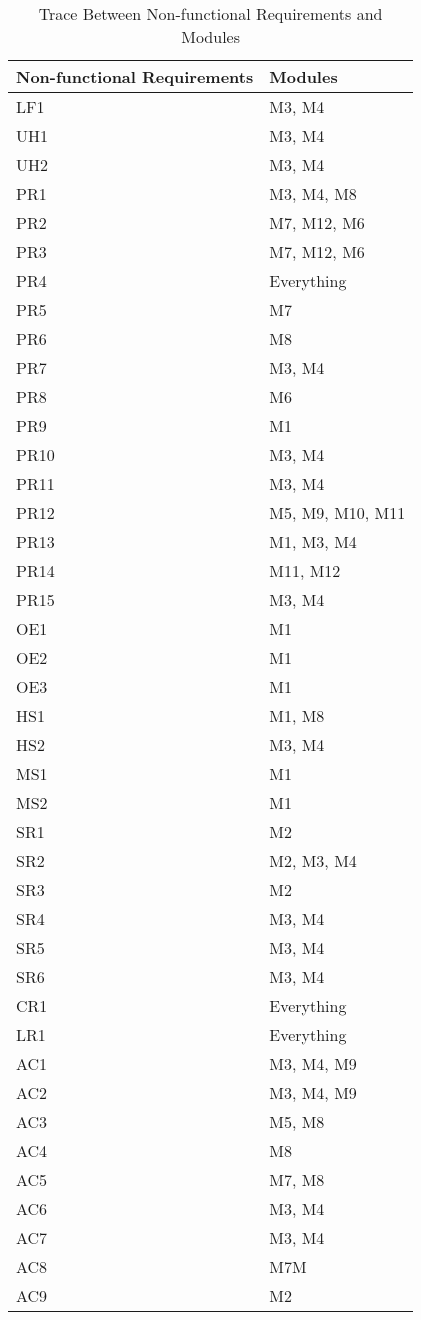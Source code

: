 \documentclass[12pt, titlepage]{article}
\begin{document}
\begin{table}[H]
  \centering
  \begin{tabular}{p{} p{}}
  \toprule
  \textbf{Non-functional Requirements} & \textbf{Modules} \\
  \midrule
  LF1  & M3, M4 \\
  UH1  & M3, M4 \\
  UH2  & M3, M4 \\
  PR1  & M3, M4, M8 \\
  PR2  & M7, M12, M6 \\
  PR3  & M7, M12, M6 \\
  PR4  & Everything \\
  PR5  & M7 \\
  PR6  & M8 \\
  PR7  & M3, M4 \\
  PR8  & M6 \\
  PR9  & M1 \\
  PR10 & M3, M4 \\
  PR11 & M3, M4 \\
  PR12 & M5, M9, M10, M11 \\
  PR13 & M1, M3, M4 \\
  PR14 & M11, M12 \\
  PR15 & M3, M4 \\
  OE1  & M1 \\
  OE2  & M1 \\
  OE3  & M1 \\
  HS1  & M1, M8 \\
  HS2  & M3, M4 \\
  MS1  & M1 \\
  MS2  & M1 \\
  SR1  & M2 \\
  SR2  & M2, M3, M4 \\
  SR3  & M2 \\
  SR4  & M3, M4 \\
  SR5  & M3, M4 \\
  SR6  & M3, M4 \\
  CR1  & Everything \\
  LR1  & Everything \\
  AC1  & M3, M4, M9 \\
  AC2  & M3, M4, M9 \\
  AC3  & M5, M8 \\
  AC4  & M8 \\
  AC5  & M7, M8 \\
  AC6  & M3, M4 \\
  AC7  & M3, M4 \\
  AC8  & M7M \\
  AC9  & M2 \\
  \bottomrule
  \end{tabular}
  \caption{Trace Between Non-functional Requirements and Modules}
  \label{TblNFRM}
  \end{table}
\end{document}
